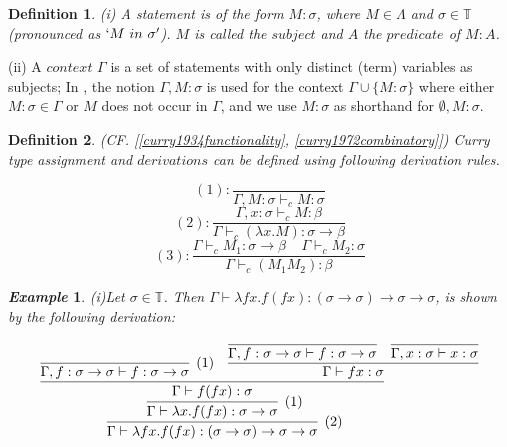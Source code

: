 \documentclass[a4paper,11pt,twoside]{report}
\newtheorem{def1}{\textbf{Definition}}[chapter]
\newtheorem{exmp}{\textit{Example}}[section]
\begin{document}
\begin{def1}
\normalfont (i) A \textit{statement} is of the form $M : \sigma$, where $M\in \Lambda$ and $\sigma \in \mathbb{T}$(pronounced as $`M\ in\ \sigma'$). $M$ is called the $subject$ and $A$ the $predicate$ of $M : A$.  
\end{def1}
(ii) A $context$ $\Gamma$ is a set of statements with only distinct (term) variables as subjects; In \cite{svb2001type}, the notion $\Gamma,M:\sigma$ is used for the context $\Gamma \cup \{M:\sigma\}$ where either $M:\sigma \in \Gamma$ or $M$ does not occur in $\Gamma$, and we use $M:\sigma$ as shorthand for $\emptyset,M:\sigma$.


\begin{def1}
\normalfont (CF. [\ref{curry1934functionality}, \ref{curry1972combinatory}]) Curry type assignment and $derivations$ can be defined using following derivation rules.  
\end{def1}

\begin{equation*}
(1):\frac{}{\Gamma ,M:\sigma \vdash _cM:\sigma} 
\end{equation*}
\begin{equation*}
(2):\frac{\Gamma ,x:\sigma \vdash _cM:\beta}{\Gamma \vdash _c(\lambda x.M):\sigma \rightarrow \beta} 
\end{equation*}
\begin{equation*}
(3):\frac{\Gamma \vdash _cM_1:\sigma \rightarrow \beta\ \ \ \ \ \Gamma \vdash _cM_2:\sigma}{\Gamma \vdash _c(M_1M_2):\beta} 
\end{equation*}

\begin{exmp}
\normalfont (i)Let $\sigma \in \mathbb{T}$. Then $\Gamma \vdash \lambda fx.f(fx):(\sigma \rightarrow \sigma)\rightarrow \sigma \rightarrow \sigma$, is shown by the following derivation:
\end{exmp}

$$
\infer[(2)]{\Gamma \vdash \lambda fx.f(fx):(\sigma \rightarrow \sigma)\rightarrow \sigma \rightarrow \sigma}{
	\infer[(1)]{\Gamma \vdash \lambda x.f(fx):\sigma \rightarrow \sigma}{
      \infer{\Gamma \vdash f(fx):\sigma}{
             \infer[(1)]{\Gamma,f:\sigma \rightarrow \sigma \vdash f:\sigma \rightarrow \sigma}{}
             & 
             \infer{\Gamma \vdash fx:\sigma}{
                \infer{\Gamma,f:\sigma \rightarrow \sigma \vdash f:\sigma \rightarrow \sigma}{}
                &
                \infer{\Gamma,x:\sigma \vdash x:\sigma}{}
             }
         }
      }		
	}
$$
\end{document}
